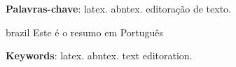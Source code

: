 
\setlength{\absparsep}{18pt} %
\begin{resumo}
 \textbf{Palavras-chave}: latex. abntex. editoração de texto.
\end{resumo}

\begin{resumo}[Resumo]
 \begin{otherlanguage*}{brazil}
   Este é o resumo em Português

   \vspace{\onelineskip}
 
   \noindent 
   \textbf{Keywords}: latex. abntex. text editoration.
 \end{otherlanguage*}
\end{resumo}

